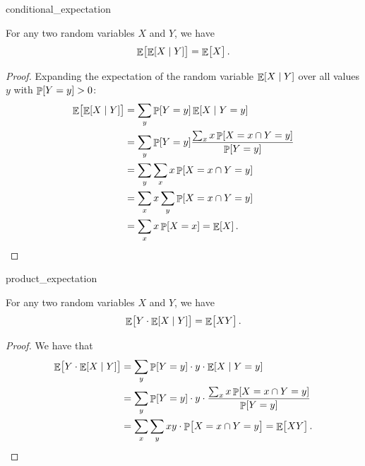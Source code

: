 \begin{fragment}{conditional_expectation}
\begin{lemma}%
    For any two random variables $X$ and $Y$, we have
    \begin{equation*}
        \mathop{\mathbb{E}}\!\left[ { \bigl. \mathop{\mathbb{E}}\!\left[ X \;\middle\vert\;  Y \right] } \right] = \mathop{\mathbb{E}}\!\left[ { \bigl. X} \right].
    \end{equation*}
\end{lemma}
\end{fragment}
\begin{proof}
    Expanding the expectation of the random variable
    $\mathop{\mathbb{E}}\!\left[ X \;\middle\vert\; Y \right]$ over all values $y$ with $\Prob{Y=y} > 0$:
    \begin{align*}
        \Ex{\bigl. \ExCond{X}{Y}}%
        &=%
        \sum_y \Prob{Y = y} \ExCond{X}{Y = y} \\
        &=%
        \sum_y \Prob{Y = y} \frac{\sum_{x} x \Prob{X = x \cap Y = y}}{\Prob{Y = y}} \\
        &=%
        \sum_{y} \sum_{x} x \Prob{X = x \cap Y = y} \\
        &=%
        \sum_{x} x \sum_y \Prob{X = x \cap Y = y} \\
        &=%
        \sum_{x} x \Prob{X = x}
        =%
        \Ex{X}.
    \end{align*}
\end{proof}

\begin{fragment}{product_expectation}
\begin{lemma}
    For any two random variables $X$ and $Y$, we have
    \begin{equation*}
        \mathop{\mathbb{E}}\!\left[ {\bigl.Y \cdot \mathop{\mathbb{E}}\!\left[ X  \;\middle\vert\; Y \right]} \right] = \mathop{\mathbb{E}}\!\left[ {\bigl. X Y} \right].
    \end{equation*}
\end{lemma}
\end{fragment}
\begin{proof}
    We have that
    \begin{align*}
        \Ex{\bigl. Y \cdot \ExCond{X}{Y}}%
        &=%
        \sum_y \Prob{Y = y} \cdot y \cdot \ExCond{X}{Y = y} \\
        &=%
        \sum_y \Prob{Y = y} \cdot y \cdot \frac{\sum_{x} x \Prob{X = x \cap Y = y}}{\Prob{Y = y}} \\
        &=%
        \sum_x \sum_y x y \cdot \Prob{\bigl. X = x \cap Y = y}
        =%
        \Ex{\bigl. X Y}.
    \end{align*}
\end{proof}

